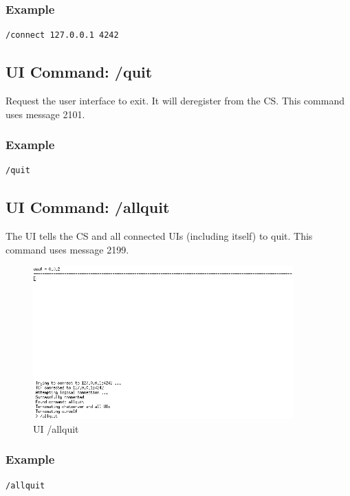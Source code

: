 \subsubsection{Example}
\begin{verbatim}
/connect 127.0.0.1 4242
\end{verbatim}
\subsection{UI Command: /quit}
Request the user interface to exit. It will deregister from the CS.
This command uses message 2101.
\subsubsection{Example}
\begin{verbatim}
/quit
\end{verbatim}
\subsection{UI Command: /allquit}
The UI tells the CS and all connected UIs (including itself) to quit.
This command uses message 2199.
\begin{figure}
    \caption{UI /allquit}
    \label{allquit}
    \centering
    \includegraphics[width=10cm]{allquit.png}
\end{figure}

\subsubsection{Example}
\begin{verbatim}
/allquit
\end{verbatim}
